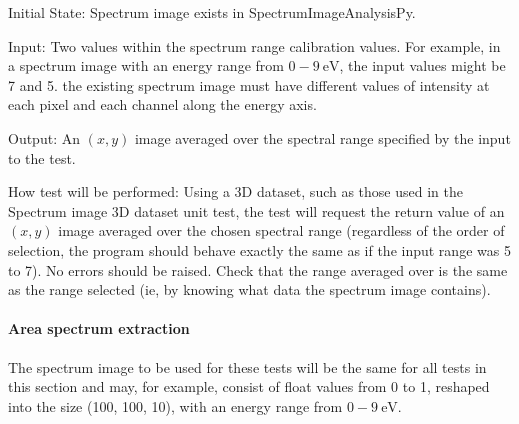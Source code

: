 \documentclass[12pt, titlepage]{article}
\newcommand{\progname}{SpectrumImageAnalysisPy}
\begin{document}
\begin{enumerate}
Initial State: Spectrum image exists in \progname{}.

Input: Two values within the spectrum range calibration values. For example, in
a spectrum image with an energy range from $0-9\ \si{\electronvolt}$, the input
values might be 7 and 5. the existing spectrum image must have different values
of intensity at each pixel and each channel along the energy axis.

Output: An $(x,y)$ image averaged over the spectral range specified by the input
to the test.

How test will be performed: Using a 3D dataset, such as those used in the
Spectrum image 3D dataset unit test, the test will request the return value of
an $(x,y)$ image averaged over the chosen spectral range (regardless of the
order of selection, the program should behave exactly the same as if the input
range was 5 to 7). No errors should be raised. Check that the range averaged
over is the same as the range selected (ie, by knowing what data the spectrum
image contains).

\end{enumerate}

\paragraph{Area spectrum extraction}

The spectrum image to be used for these tests will be the same for all tests in
this section and may, for example, consist of float values from 0 to 1, reshaped
into the size (100, 100, 10), with an energy range from $0-9\
\si{\electronvolt}$.
\end{document}

